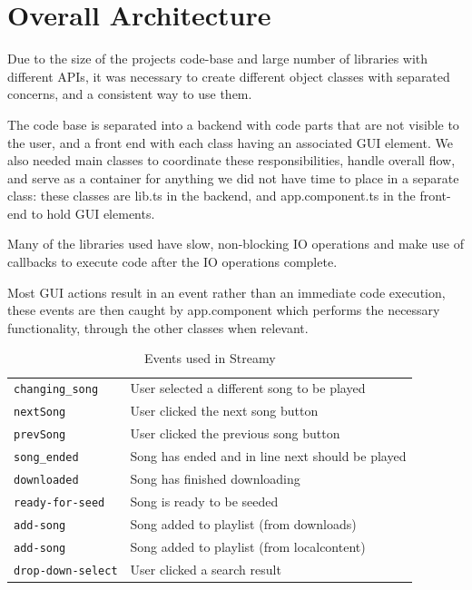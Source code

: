 \section{Overall Architecture}
Due to the size of the projects code-base and large number of libraries with different \acs{API}s, 
it was necessary to create different object classes with separated concerns,
and a consistent way to use them.

The code base is separated into a backend with code parts that are not visible to the user,
and a front end with each class having an associated \acs{GUI} element.
We also needed main classes to coordinate these responsibilities, handle overall flow,
and serve as a container for anything we did not have time to place in a separate class:
these classes are lib.ts in the backend,
and app.component.ts in the front-end to hold \acs{GUI} elements.

Many of the libraries used have slow, non-blocking IO operations
and make use of callbacks to execute code after the IO operations complete.

Most \acs{GUI} actions result in an event rather than an immediate code execution, 
these events are then caught by app.component
which performs the necessary functionality, through the other classes when relevant.

\begin{table}[h]
	\centering
	\begin{tabular}{l | l}
	    \verb|changing_song|    & User selected a different song to be played \\
		\verb|nextSong|         & User clicked the next song button \\
		\verb|prevSong|         & User clicked the previous song button \\
		\verb|song_ended|       & Song has ended and in line next should be played \\
		\verb|downloaded|       & Song has finished downloading \\
		\verb|ready-for-seed|   & Song is ready to be seeded \\
		\verb|add-song|         & Song added to playlist (from downloads) \\
		\verb|add-song|         & Song added to playlist (from localcontent) \\
		\verb|drop-down-select| & User clicked a search result \\
	\end{tabular}
	\caption{Events used in Streamy}
	\label{table:events}
\end{table}


